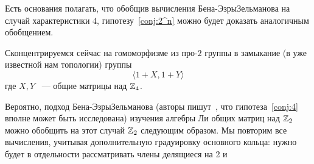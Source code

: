 Есть основания полагать, что обобщив вычисления Бена-Эзры\textemdash Зельманова на случай характеристики $4$, гипотезу~\ref{conj:2^n} можно будет доказать аналогичным обобщением.

Сконцентрируемся сейчас на гомоморфизме из про-$2$ группы в замыкание (в уже известной нам топологии) группы
\[\langle 1+X, 1+Y \rangle\]
где $X,Y$ ~--- общие матрицы над $\mathbb{Z}_4$.

Вероятно, подход Бена-Эзры\textemdash Зельманова (авторы пишут~\cite[BEZ]{Ben-Ezra-Zelmanov}, что гипотеза~\ref{conj:4} вполне может быть исследована) изучения алгебры Ли общих матриц над $\mathbb{Z}_2$ можно обобщить на этот случай $\mathbb{Z}_2$ следующим образом.
Мы повторим все вычисления, учитывая дополнительную градуировку основного кольца: нужно будет в отдельности рассматривать члены делящиеся на 2 и

